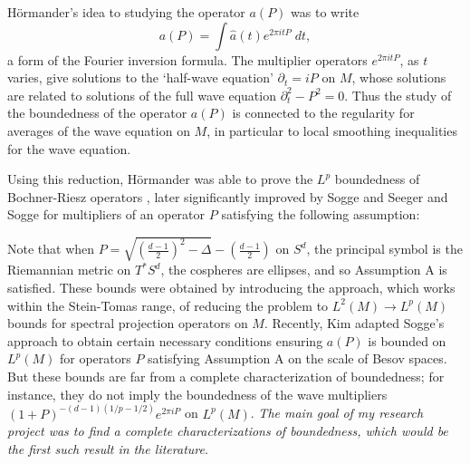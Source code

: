 \documentclass[11pt]{article}
\DeclareMathOperator{\RR}{\mathbb{R}}
\begin{document}
H\"{o}rmander's idea to studying the operator $a(P)$ was to write
%
\[ a(P) = \int \widehat{a}(t) e^{2 \pi i t P}\; dt, \]
%
a form of the Fourier inversion formula. The multiplier operators $e^{2 \pi i t P}$, as $t$ varies, give solutions to the `half-wave equation' $\partial_t = i P$ on $M$, whose solutions are related to solutions of the full wave equation $\partial_t^2 - P^2 = 0$. Thus the study of the boundedness of the operator $a(P)$ is connected to the regularity for averages of the wave equation on $M$, in particular to local smoothing inequalities for the wave equation. %

Using this reduction, H\"{o}rmander was able to prove the $L^p$ boundedness of Bochner-Riesz operators \cite{HormanderRiesz}, later significantly improved by Sogge \cites{SoggeSpherical,SoggeRieszMeans} and Seeger and Sogge \cite{SeegerSoggeBochnerRiesz} for multipliers of an operator $P$ satisfying the following assumption:
%
\begin{center}
\fbox{%
    \parbox{\textwidth - 2em}{%
        {\bf Assumption A}: If $p_{\text{prin}}: T^* M \to [0,\infty)$ is the principal symbol of $P$, then for each $x \in M$ the `cosphere' $S_x^* = \{ \xi \in T^*_x M : p_{\text{prin}}(x,\xi) = 1 \}$ has non-vanishing Gaussian curvature.
    }%
}
\end{center}
%
Note that when $P = \sqrt{ ( {\scriptstyle \frac{d-1}{2} } )^2 - \Delta } - \left( {\scriptstyle \frac{d-1}{2}} \right)$ on $S^d$, the principal symbol is the Riemannian metric on $T^* S^d$, the cospheres are ellipses, and so Assumption A is satisfied. These bounds were obtained by introducing the approach, which works within the Stein-Tomas range, of reducing the problem to $L^2(M) \to L^p(M)$ bounds for spectral projection operators on $M$. Recently, Kim \cite{KimManifold} adapted Sogge's approach to obtain certain necessary conditions ensuring $a(P)$ is bounded on $L^p(M)$ for operators $P$ satisfying Assumption A on the scale of Besov spaces. But these bounds are far from a complete characterization of boundedness; for instance, they do not imply the boundedness of the wave multipliers $(1 + P)^{-(d-1)(1/p - 1/2)} e^{2 \pi i P}$ on $L^p(M)$. \emph{The main goal of my research project was to find a complete characterizations of boundedness, which would be the first such result in the literature}.
\end{document}
